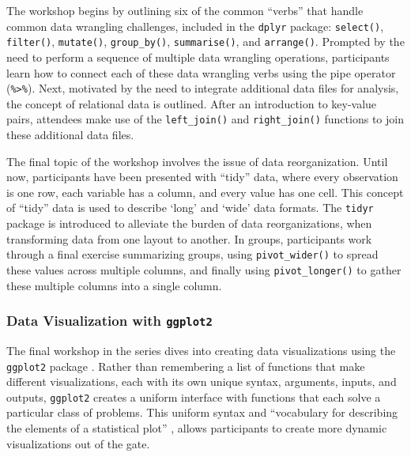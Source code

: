 \documentclass[12pt]{article}
\begin{document}

\quad The workshop begins by outlining six of the common ``verbs'' that handle
common data wrangling challenges, included in the  \texttt{dplyr} package: 
\texttt{select()}, \texttt{filter()}, \texttt{mutate()}, \texttt{group\_by()},
\texttt{summarise()}, and \texttt{arrange()}. Prompted by the need to perform a
sequence of multiple data wrangling operations, participants learn how to
connect each of these data wrangling verbs using the pipe operator 
(\texttt{\%>\%}). Next, motivated by the need to integrate additional data files
for analysis, the concept of relational data is outlined. After an introduction 
to key-value pairs, attendees make use of the \texttt{left\_join()} and 
\texttt{right\_join()} functions to join these additional data files. 

\quad The final topic of the workshop involves the issue of data reorganization.
Until now, participants have been presented with ``tidy'' data, where every
observation is one row, each variable has a column, and every value has one
cell. This concept of ``tidy'' data is used to describe `long' and `wide' data
formats. The \texttt{tidyr} package is introduced to alleviate the burden of
data reorganizations, when transforming data from one layout to another. In
groups, participants work through a final exercise summarizing groups, using 
\texttt{pivot\_wider()} to spread these values across multiple columns, and
finally using \texttt{pivot\_longer()} to gather these multiple columns
into a single column.

\subsubsection{Data Visualization with \texttt{ggplot2}}
\label{sec:vizual} 

\quad The final workshop in the series dives into creating data visualizations
using the \texttt{ggplot2} package \citep{ggplot}. Rather than remembering a
list of functions that make different visualizations, each with its own unique
syntax, arguments, inputs, and outputs, \texttt{ggplot2} creates a uniform
interface with functions that each solve a particular class of problems. This
uniform syntax and ``vocabulary for describing the elements of a statistical 
plot'' \citep[p.\ 261]{nolan-viz}, allows participants to create more dynamic 
visualizations out of the gate. 
\end{document}
